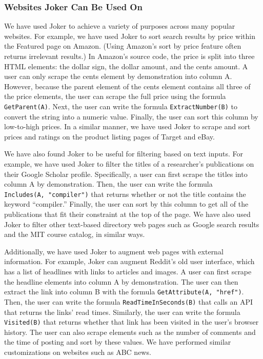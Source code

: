 \documentclass[sigconf,10pt]{acmart}
\begin{document}
\hypertarget{websites-joker-can-be-used-on}{%
\subsubsection{Websites Joker Can Be Used
On}\label{websites-joker-can-be-used-on}}

We have used Joker to achieve a variety of purposes across many popular
websites. For example, we have used Joker to sort search results by
price within the Featured page on Amazon. (Using Amazon's sort by price
feature often returns irrelevant results.) In Amazon's source code, the
price is split into three HTML elements: the dollar sign, the dollar
amount, and the cents amount. A user can only scrape the cents element
by demonstration into column A. However, because the parent element of
the cents element contains all three of the price elements, the user can
scrape the full price using the formula \texttt{GetParent(A)}. Next, the
user can write the formula \texttt{ExtractNumber(B)} to convert the
string into a numeric value. Finally, the user can sort this column by
low-to-high prices. In a similar manner, we have used Joker to scrape
and sort prices and ratings on the product listing pages of Target and
eBay.

We have also found Joker to be useful for filtering based on text
inputs. For example, we have used Joker to filter the titles of a
researcher's publications on their Google Scholar profile. Specifically,
a user can first scrape the titles into column A by demonstration. Then,
the user can write the formula \texttt{Includes(A,\ "compiler")} that
returns whether or not the title contains the keyword ``compiler.''
Finally, the user can sort by this column to get all of the publications
that fit their constraint at the top of the page. We have also used
Joker to filter other text-based directory web pages such as Google
search results and the MIT course catalog, in similar ways.

Additionally, we have used Joker to augment web pages with external
information. For example, Joker can augment Reddit's old user interface,
which has a list of headlines with links to articles and images. A user
can first scrape the headline elements into column A by demonstration.
The user can then extract the link into column B with the formula
\texttt{GetAttribute(A,\ "href")}. Then, the user can write the formula
\texttt{ReadTimeInSeconds(B)} that calls an API that returns the links'
read times. Similarly, the user can write the formula
\texttt{Visited(B)} that returns whether that link has been visited in
the user's browser history. The user can also scrape elements such as
the number of comments and the time of posting and sort by these values.
We have performed similar customizations on websites such as ABC news.
\end{document}
